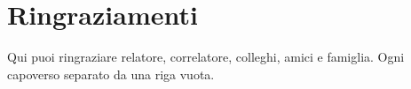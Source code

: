\chapter*{Ringraziamenti}
Qui puoi ringraziare relatore, correlatore, colleghi, amici e famiglia.
Ogni capoverso separato da una riga vuota.
